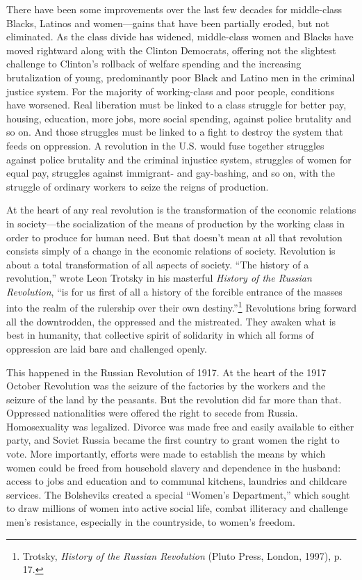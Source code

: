 There have been some improvements over the last few decades for middle-class Blacks, Latinos and women---gains that have been partially eroded, but not eliminated. As the class divide has widened, middle-class women and Blacks have moved rightward along with the Clinton Democrats, offering not the slightest challenge to Clinton's rollback of welfare spending and the increasing brutalization of young, predominantly poor Black and Latino men in the criminal justice system. For the majority of working-class and poor people, conditions have worsened. Real liberation must be linked to a class struggle for better pay, housing, education, more jobs, more social spending, against police brutality and so on. And those struggles must be linked to a fight to destroy the system that feeds on oppression. A revolution in the U.S. would fuse together struggles against police brutality and the criminal injustice system, struggles of women for equal pay, struggles against immigrant- and gay-bashing, and so on, with the struggle of ordinary workers to seize the reigns of production.

At the heart of any real revolution is the transformation of the economic relations in society---the socialization of the means of production by the working class in order to produce for human need. But that doesn't mean at all that revolution consists simply of a change in the economic relations of society. Revolution is about a total transformation of all aspects of society. ``The history of a revolution,'' wrote Leon Trotsky in his masterful \emph{History of the Russian Revolution}, ``is for us first of all a history of the forcible entrance of the masses into the realm of the rulership over their own destiny.''\footnote{Trotsky, \emph{History of the Russian Revolution} (Pluto Press, London, 1997), p. 17.} Revolutions bring forward all the downtrodden, the oppressed and the mistreated. They awaken what is best in humanity, that collective spirit of solidarity in which all forms of oppression are laid bare and challenged openly.

This happened in the Russian Revolution of 1917. At the heart of the 1917 October Revolution was the seizure of the factories by the workers and the seizure of the land by the peasants. But the revolution did far more than that. Oppressed nationalities were offered the right to secede from Russia. Homosexuality was legalized. Divorce was made free and easily available to either party, and Soviet Russia became the first country to grant women the right to vote. More importantly, efforts were made to establish the means by which women could be freed from household slavery and dependence in the husband: access to jobs and education and to communal kitchens, laundries and childcare services. The Bolsheviks created a special ``Women's Department,'' which sought to draw millions of women into active social life, combat illiteracy and challenge men's resistance, especially in the countryside, to women's freedom.

